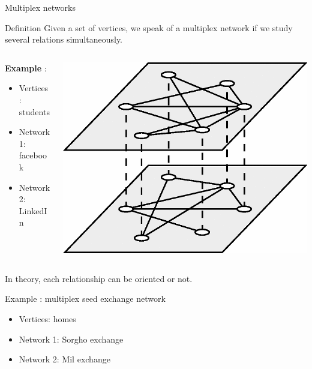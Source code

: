 \documentclass[compress,10pt]{beamer}
\begin{document}
\begin{frame}{Multiplex networks}

\begin{block}{Definition}
Given a set of vertices, we speak of a multiplex network if we study several relations simultaneously. 
\end{block}
\vspace{2em}

\begin{columns}
\begin{column}{0.5\textwidth}
\textbf{Example} : 
\begin{itemize}
\item Vertices :  students
\item Network  1:    facebook 
\item Network  2:    LinkedIn 
 \end{itemize}
\end{column}
\begin{column}{0.5\textwidth} 
 \begin{center}
  \includegraphics[width = 0.7 \linewidth]{plots/multiplex_network.png}
\end{center}
\end{column}
\end{columns}

In theory, each relationship can be oriented or not. 
\end{frame}

   \begin{frame}{Example  :  multiplex seed exchange network}
 

\begin{itemize}
\item Vertices: homes
\item Network 1: Sorgho exchange
\item Network 2: Mil exchange
\end{itemize}

\end{frame}
 
\end{document}

